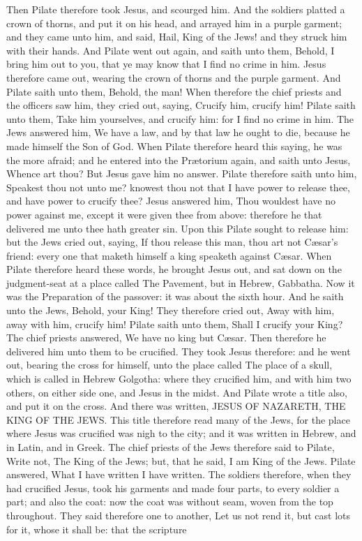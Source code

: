 Then Pilate therefore took Jesus, and scourged him. And the soldiers platted a crown of thorns, and put it on his head, and arrayed him in a purple garment; and they came unto him, and said, Hail, King of the Jews! and they struck him with their hands. And Pilate went out again, and saith unto them, Behold, I bring him out to you, that ye may know that I find no crime in him. Jesus therefore came out, wearing the crown of thorns and the purple garment. And Pilate saith unto them, Behold, the man! When therefore the chief priests and the officers saw him, they cried out, saying, Crucify him, crucify him! Pilate saith unto them, Take him yourselves, and crucify him: for I find no crime in him. The Jews answered him, We have a law, and by that law he ought to die, because he made himself the Son of God. When Pilate therefore heard this saying, he was the more afraid; and he entered into the Prætorium again, and saith unto Jesus, Whence art thou? But Jesus gave him no answer. Pilate therefore saith unto him, Speakest thou not unto me? knowest thou not that I have power to release thee, and have power to crucify thee? Jesus answered him, Thou wouldest have no power against me, except it were given thee from above: therefore he that delivered me unto thee hath greater sin. Upon this Pilate sought to release him: but the Jews cried out, saying, If thou release this man, thou art not Cæsar’s friend: every one that maketh himself a king speaketh against Cæsar. When Pilate therefore heard these words, he brought Jesus out, and sat down on the judgment-seat at a place called The Pavement, but in Hebrew, Gabbatha. Now it was the Preparation of the passover: it was about the sixth hour. And he saith unto the Jews, Behold, your King! They therefore cried out, Away with him, away with him, crucify him! Pilate saith unto them, Shall I crucify your King? The chief priests answered, We have no king but Cæsar. Then therefore he delivered him unto them to be crucified.  They took Jesus therefore: and he went out, bearing the cross for himself, unto the place called The place of a skull, which is called in Hebrew Golgotha: where they crucified him, and with him two others, on either side one, and Jesus in the midst. And Pilate wrote a title also, and put it on the cross. And there was written, JESUS OF NAZARETH, THE KING OF THE JEWS. This title therefore read many of the Jews, for the place where Jesus was crucified was nigh to the city; and it was written in Hebrew, and in Latin, and in Greek. The chief priests of the Jews therefore said to Pilate, Write not, The King of the Jews; but, that he said, I am King of the Jews. Pilate answered, What I have written I have written.  The soldiers therefore, when they had crucified Jesus, took his garments and made four parts, to every soldier a part; and also the coat: now the coat was without seam, woven from the top throughout. They said therefore one to another, Let us not rend it, but cast lots for it, whose it shall be: that the scripture 